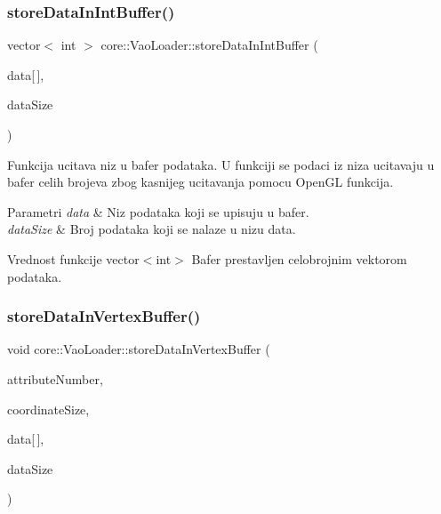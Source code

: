 \subsubsection{\texorpdfstring{store\+Data\+In\+Int\+Buffer()}{storeDataInIntBuffer()}}
{\footnotesize\ttfamily vector$<$ int $>$ core\+::\+Vao\+Loader\+::store\+Data\+In\+Int\+Buffer (\begin{DoxyParamCaption}\item[{G\+Lint}]{data\mbox{[}$\,$\mbox{]},  }\item[{G\+Lint}]{data\+Size }\end{DoxyParamCaption})\hspace{0.3cm}{\ttfamily [private]}}



Funkcija ucitava niz u bafer podataka. U funkciji se podaci iz niza ucitavaju u bafer celih brojeva zbog kasnijeg ucitavanja pomocu Open\+GL funkcija. 


\begin{DoxyParams}{Parametri}
{\em data} & Niz podataka koji se upisuju u bafer. \\
\hline
{\em data\+Size} & Broj podataka koji se nalaze u nizu data. \\
\hline
\end{DoxyParams}
\begin{DoxyReturn}{Vrednost funkcije}
vector$<$int$>$ Bafer prestavljen celobrojnim vektorom podataka. 
\end{DoxyReturn}
\mbox{\label{classcore_1_1VaoLoader_a234b87947a46ffcaea7dc6de09185a41}} 
\subsubsection{\texorpdfstring{store\+Data\+In\+Vertex\+Buffer()}{storeDataInVertexBuffer()}}
{\footnotesize\ttfamily void core\+::\+Vao\+Loader\+::store\+Data\+In\+Vertex\+Buffer (\begin{DoxyParamCaption}\item[{G\+Lint}]{attribute\+Number,  }\item[{int}]{coordinate\+Size,  }\item[{G\+Lfloat}]{data\mbox{[}$\,$\mbox{]},  }\item[{G\+Lint}]{data\+Size }\end{DoxyParamCaption})\hspace{0.3cm}{\ttfamily [private]}}



